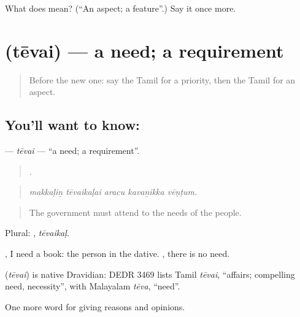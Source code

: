 \begin{tcolorbox}[breakable,colback=teal!4,colframe=teal!35!black,title={Before you move on}]
What does  mean? (\textquotedblleft{}An aspect; a feature\textquotedblright{}.) Say it once more.
\end{tcolorbox}
\section[\texorpdfstring{\ta{தேவை} (tēvai)}{தேவை (tēvai)}]{ (tēvai) — a need; a requirement}

\label{lesson:TA-C354-tevai}



\begin{quote}
Before the new one: say the Tamil for a priority, then the Tamil for an aspect.
\end{quote}

\subsection*{You'll want to know: }
\textbf{} — \emph{tēvai} — \textquotedblleft{}a need; a requirement\textquotedblright{}.

\begin{quote}
    .
\end{quote}

\begin{quote}
\emph{makkaḷiṉ tēvaikaḷai aracu kavaṉikka vēṇṭum.}
\end{quote}

\begin{quote}
The government must attend to the needs of the people.
\end{quote}

Plural: , \emph{tēvaikaḷ}.

   , I need a book: the person in the dative. , there is no need.

\begin{cousinweb}
\textbf{} (\emph{tēvai}) is native Dravidian: DEDR 3469 lists Tamil \emph{tēvai}, \textquotedblleft{}affairs; compelling need, necessity\textquotedblright{}, with Malayalam \emph{tēva}, \textquotedblleft{}need\textquotedblright{}.
\end{cousinweb}

\begin{grammarlens}[title={What you've built}]
One more word for giving reasons and opinions.
\end{grammarlens}

